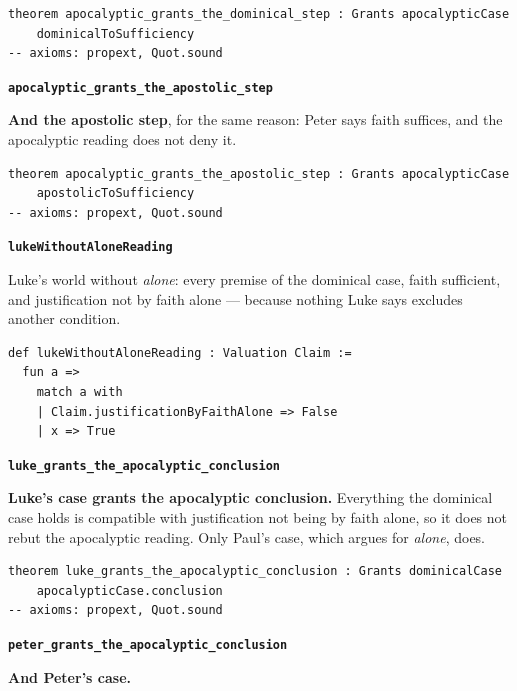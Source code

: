 \documentclass[11pt]{article}
\begin{document}
{\small\begin{verbatim}
theorem apocalyptic_grants_the_dominical_step : Grants apocalypticCase
    dominicalToSufficiency
-- axioms: propext, Quot.sound
\end{verbatim}}
\par\medskip\noindent\textbf{\texttt{apocalyptic\_\allowbreak{}grants\_\allowbreak{}the\_\allowbreak{}apostolic\_\allowbreak{}step}}\par\nobreak\noindent
\textbf{And the apostolic step}, for the same reason: Peter says faith suffices, and the apocalyptic reading does not deny it.

{\small\begin{verbatim}
theorem apocalyptic_grants_the_apostolic_step : Grants apocalypticCase
    apostolicToSufficiency
-- axioms: propext, Quot.sound
\end{verbatim}}
\par\medskip\noindent\textbf{\texttt{luke\allowbreak{}Without\allowbreak{}Alone\allowbreak{}Reading}}\par\nobreak\noindent
Luke's world without \emph{alone}: every premise of the dominical case, faith sufficient, and justification not by faith alone — because nothing Luke says excludes another condition.

{\small\begin{verbatim}
def lukeWithoutAloneReading : Valuation Claim :=
  fun a =>
    match a with
    | Claim.justificationByFaithAlone => False
    | x => True
\end{verbatim}}
\par\medskip\noindent\textbf{\texttt{luke\_\allowbreak{}grants\_\allowbreak{}the\_\allowbreak{}apocalyptic\_\allowbreak{}conclusion}}\par\nobreak\noindent
\textbf{Luke's case grants the apocalyptic conclusion.} Everything the dominical case holds is compatible with justification not being by faith alone, so it does not rebut the apocalyptic reading. Only Paul's case, which argues for \emph{alone}, does.

{\small\begin{verbatim}
theorem luke_grants_the_apocalyptic_conclusion : Grants dominicalCase
    apocalypticCase.conclusion
-- axioms: propext, Quot.sound
\end{verbatim}}
\par\medskip\noindent\textbf{\texttt{peter\_\allowbreak{}grants\_\allowbreak{}the\_\allowbreak{}apocalyptic\_\allowbreak{}conclusion}}\par\nobreak\noindent
\textbf{And Peter's case.}
\end{document}
